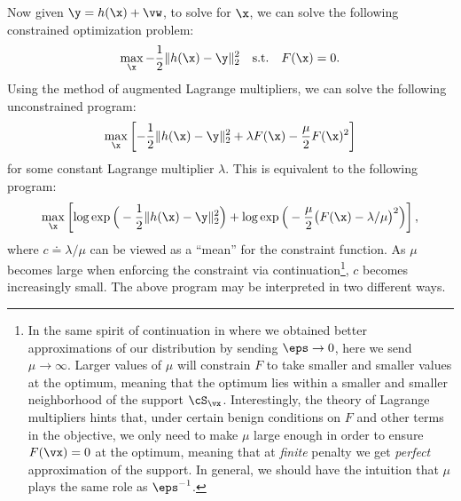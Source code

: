 \documentclass[../../book-main.tex]{subfiles}
\begin{document}
Now given $\y = h(\x) +\vw$, to solve for $\x$, we can solve the
following constrained optimization problem:
\begin{equation}
    \max_{\x} - \frac{1}{2}\|h(\x) - \y\|_2^2 \quad \mbox{s.t.} \quad
    F(\x) = {0}.
\end{equation}
Using the method of augmented Lagrange multipliers, we can solve the
following unconstrained program:
\begin{equation}
    \max_{\x} \left[-\frac{1}{2}\|h(\x) - \y\|_2^2  + \lambda F(\x) -
    \frac{\mu}{2} F(\x)^2\right]
\end{equation}
for some constant Lagrange multiplier $\lambda$.
This is equivalent to the following program:
\begin{equation}\label{eq:lagrange_multiplier_continuation}
    \max_{\x} \left[\log \exp\Big(- \frac{1}{2}\|h(\x) -
        \y\|_2^2\Big) + \log \exp\Big( - \frac{\mu}{2} \big(F(\x) -
    \lambda/\mu\big)^2\Big)\right],
\end{equation}
where $c \doteq {\lambda}/{\mu}$ can be viewed as a ``mean''  for the
constraint function. As $\mu$ becomes large when enforcing the
constraint via continuation\footnote{In the same spirit of
    continuation in  where we obtained better
    approximations of our distribution by sending \(\eps \to 0\), here we
    send \(\mu \to \infty\). Larger values of \(\mu\) will constrain
    \(F\) to take smaller and smaller values at the optimum, meaning that
    the optimum lies within a smaller and smaller neighborhood of the
    support \(\cS_{\vx}\). Interestingly, the theory of Lagrange
    multipliers hints that, under certain benign conditions on \(F\) and
    other terms in the objective, we only need to make \(\mu\) large
    enough in order to ensure \(F(\vx) = 0\) at the optimum, meaning that
    at \textit{finite} penalty we get \textit{perfect} approximation of
    the support. In general, we should have the intuition that \(\mu\)
plays the same role as \(\eps^{-1}\).}, $c$ becomes increasingly
small. The above program may be interpreted in two different ways.
\end{document}
